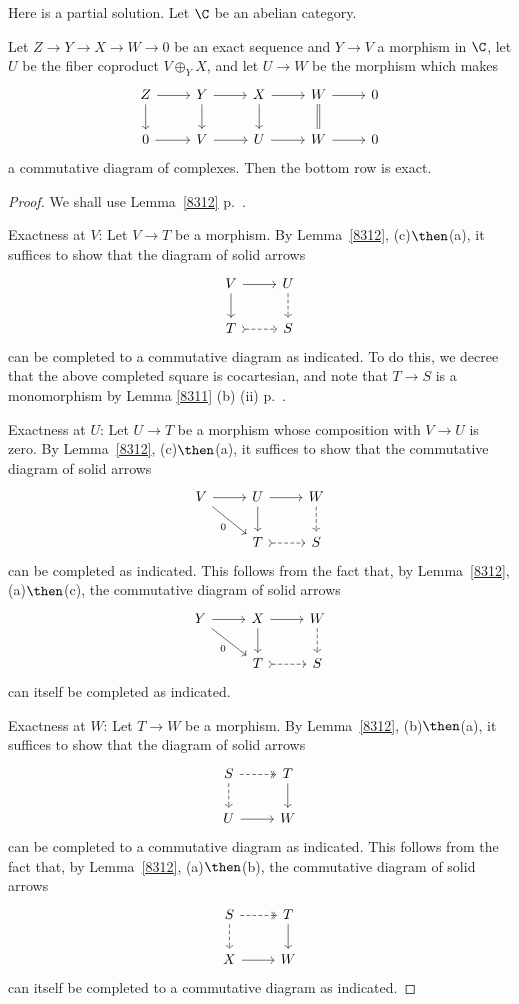 \documentclass[12pt]{article}
\theoremstyle{remark}
\theoremstyle{definition}
\begin{document}


Here is a partial solution. Let $\C$ be an abelian category. 

\begin{lem}
Let $Z\to Y\to X\to W\to0$ be an exact sequence and $Y\to V$ a morphism in $\C$, let $U$ be the fiber coproduct $V\oplus_YX$, and let $U\to W$ be the morphism which makes 
$$
\begin{tikzcd}
Z\ar{d}\ar{r}&Y\ar{d}\ar{r}&X\ar{d}\ar{r}&W\ar[equal]{d}\ar{r}&0\\ 
0\ar{r}&V\ar{r}&U\ar{r}&W\ar{r}&0
\end{tikzcd}
$$ 
a commutative diagram of complexes. Then the bottom row is exact.
\end{lem}

\begin{proof}
We shall use Lemma~\ref{8312} p.~.

\nn Exactness at $V$: Let $V\to T$ be a morphism. By Lemma~\ref{8312}, (c)$\then$(a), it suffices to show that the diagram of solid arrows 
$$
\begin{tikzcd}
V\ar{r}\ar{d}&U\ar[dashed]{d}\\ 
T\ar[dashed,tail]{r}&S
\end{tikzcd}
$$ 
can be completed to a commutative diagram as indicated. To do this, we decree that the above completed square is cocartesian, and note that $T\to S$ is a monomorphism by Lemma \ref{8311} (b) (ii) p.~.

\nn Exactness at $U$: Let $U\to T$ be a morphism whose composition with $V\to U$ is zero. By Lemma~\ref{8312}, (c)$\then$(a), it suffices to show that the commutative diagram of solid arrows 
$$
\begin{tikzcd}
V\ar{r}\ar{dr}[swap]{0}&U\ar{r}\ar{d}&W\ar[dashed]{d}\\ 
{}&T\ar[dashed,tail]{r}&S
\end{tikzcd}
$$ 
can be completed as indicated. This follows from the fact that, by Lemma~\ref{8312}, (a)$\then$(c), the commutative diagram of solid arrows 
$$
\begin{tikzcd}
Y\ar{r}\ar{dr}[swap]{0}&X\ar{r}\ar{d}&W\ar[dashed]{d}\\ 
{}&T\ar[dashed,tail]{r}&S
\end{tikzcd}
$$ 
can itself be completed as indicated.

\nn Exactness at $W$: Let $T\to W$ be a morphism. By Lemma~\ref{8312}, (b)$\then$(a), it suffices to show that the diagram of solid arrows 
$$
\begin{tikzcd}
S\ar[dashed,two heads]{r}\ar[dashed]{d}&T\ar{d}\\ 
U\ar{r}&W
\end{tikzcd}
$$ 
can be completed to a commutative diagram as indicated. This follows from the fact that, by Lemma~\ref{8312}, (a)$\then$(b), the commutative diagram of solid arrows 
$$
\begin{tikzcd}
S\ar[dashed,two heads]{r}\ar[dashed]{d}&T\ar{d}\\ 
X\ar{r}&W
\end{tikzcd}
$$ 
can itself be completed to a commutative diagram as indicated.
\end{proof}
\end{document}

